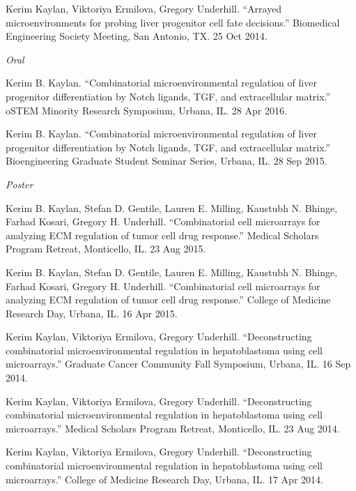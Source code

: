 \documentclass[11pt,article,oneside]{memoir}
\begin{document}
\ind Kerim Kaylan, Viktoriya Ermilova, Gregory Underhill. ``Arrayed microenvironments for probing liver progenitor cell fate decisions.'' Biomedical Engineering Society Meeting, San Antonio, TX. 25 Oct 2014.

\pagebreak


\noindent\emph{Oral\vspace{0.05in}}

\ind Kerim B. Kaylan. ``Combinatorial microenvironmental regulation of liver progenitor differentiation by Notch ligands, TGF\textbeta, and extracellular matrix.'' oSTEM Minority Research Symposium, Urbana, IL. 28 Apr 2016.

\ind Kerim B. Kaylan. ``Combinatorial microenvironmental regulation of liver progenitor differentiation by Notch ligands, TGF\textbeta, and extracellular matrix.'' Bioengineering Graduate Student Seminar Series, Urbana, IL. 28 Sep 2015.

\bigskip

\noindent\emph{Poster\vspace{0.05in}}

\ind Kerim B. Kaylan, Stefan D. Gentile, Lauren E. Milling, Kaustubh N. Bhinge, Farhad Kosari, Gregory H. Underhill. ``Combinatorial cell microarrays for analyzing ECM regulation of tumor cell drug response.'' Medical Scholars Program Retreat, Monticello, IL. 23 Aug 2015.

\ind Kerim B. Kaylan, Stefan D. Gentile, Lauren E. Milling, Kaustubh N. Bhinge, Farhad Kosari, Gregory H. Underhill. ``Combinatorial cell microarrays for analyzing ECM regulation of tumor cell drug response.'' College of Medicine Research Day, Urbana, IL. 16 Apr 2015.

\ind Kerim Kaylan, Viktoriya Ermilova, Gregory Underhill. ``Deconstructing combinatorial microenvironmental regulation in hepatoblastoma using cell microarrays.'' Graduate Cancer Community Fall Symposium, Urbana, IL. 16 Sep 2014.

\ind Kerim Kaylan, Viktoriya Ermilova, Gregory Underhill. ``Deconstructing combinatorial microenvironmental regulation in hepatoblastoma using cell microarrays.'' Medical Scholars Program Retreat, Monticello, IL. 23 Aug 2014.

\ind Kerim Kaylan, Viktoriya Ermilova, Gregory Underhill. ``Deconstructing combinatorial microenvironmental regulation in hepatoblastoma using cell microarrays.'' College of Medicine Research Day, Urbana, IL. 17 Apr 2014.
\end{document}
